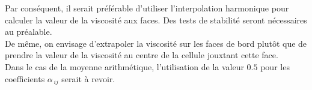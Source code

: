 Par conséquent, il serait préférable d'utiliser l'interpolation harmonique pour
calculer la valeur de la viscosité aux faces. Des tests de stabilité seront
nécessaires au préalable.
\\
De même, on envisage d'extrapoler la viscosité sur les faces de bord plutôt que
de prendre la valeur de la viscosité au centre de la cellule jouxtant cette face.\\
Dans le cas de la moyenne arithm\'etique, l'utilisation de la valeur $0.5$ pour
les coefficients $\alpha_{\,ij}$ serait \`a revoir.
